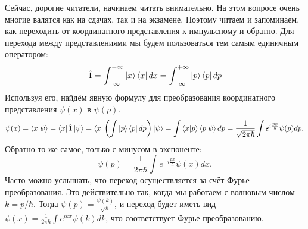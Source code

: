 Сейчас, дорогие читатели, начинаем читать внимательно. На этом вопросе очень многие валятся как на сдачах, так и на экзамене. Поэтому читаем и запоминаем, как переходить от координатного представления к импульсному и обратно. Для перехода между представлениями мы будем пользоваться тем самым единичным оператором:
\[
\hat{1} = \int_{-\infty}^{+\infty}\ket{x}\bra{x}dx =\int_{-\infty}^{+\infty}\ket{p}\bra{p}dp
\]
Используя его, найдём явную формулу для преобразования координатного представления $\psi(x)$ в $\psi(p)$.
\[
\psi(x) = \bra{x}\ket{\psi} = \bra{x}\hat{1}\ket{\psi} = \bra{x} \left( \int\ket{p}\bra{p}dp \right) \ket{\psi} = \int\bra{x}\ket{p}\bra{p}\ket{\psi}dp = \frac{1}{\sqrt{2\pi\hbar}}\int e^{i\frac{px}{\hbar}}\psi(p)dp.
\]
Обратно то же самое, только с минусом в экспоненте:
\[
\psi(p) = \frac{1}{2\pi\hbar}\int e^{-i\frac{px}{\hbar}}\psi(x)dx.
\]
Часто можно услышать, что переход осуществляется за счёт Фурье преобразования. Это действительно так, когда мы работаем с волновым числом $k=p/\hbar$. Тогда $\psi(p) = \frac{\psi(k)}{\sqrt{\hbar}}$, и переход будет иметь вид $\psi(x) = \frac{1}{2\pi\hbar}\int e^{ikx}\psi(k)dk$, что соответствует Фурье преобразованию. 

